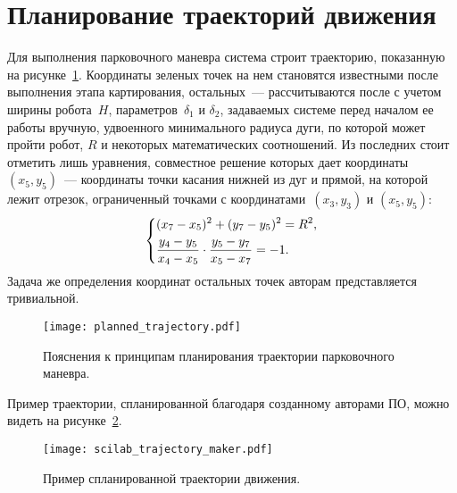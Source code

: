 \newpage
\section{Планирование траекторий движения}
Для выполнения парковочного маневра система строит траекторию, показанную на рисунке~\ref{img_planned_trajectory}.
Координаты зеленых точек на нем становятся известными после выполнения этапа картирования, остальных~--- рассчитываются после с учетом ширины робота~$H$, параметров~$\delta_1$ и $\delta_2$, задаваемых системе перед началом ее работы вручную, удвоенного минимального радиуса дуги, по которой может пройти робот, $R$ и некоторых математических соотношений.
Из последних стоит отметить лишь уравнения, совместное решение которых дает координаты $(x_5, y_5)$~--- координаты точки касания нижней из дуг и прямой, на которой лежит отрезок, ограниченный точками с координатами~$(x_3, y_3)$ и $(x_5, y_5)$:
\begin{equation}
    \left\{
    \begin{aligned}
        & (x_7 - x_5)^2 + (y_7 - y_5)^2 = R^2, \\
        & \frac{y_4 - y_5}{x_4 - x_5} \cdot \frac{y_5 - y_7}{x_5 - x_7} = -1 \ldotp
    \end{aligned}
    \right.
\end{equation}
Задача же определения координат остальных точек авторам представляется тривиальной.

\begin{figure}[h!]
    \centering
    \texttt{[image: planned\_trajectory.pdf]}
    \vspace{0cm}
    \caption{Пояснения к принципам планирования траектории парковочного маневра.}
    \label{img_planned_trajectory}
\end{figure}

Пример траектории, спланированной благодаря созданному авторами ПО, можно видеть на рисунке~\ref{img_scilab_trajectory_maker}.

\begin{figure}[h!]
    \centering
    \texttt{[image: scilab\_trajectory\_maker.pdf]}
    \caption{Пример спланированной траектории движения.}
    \label{img_scilab_trajectory_maker}
\end{figure}

\newpage \mbox{} \newpage